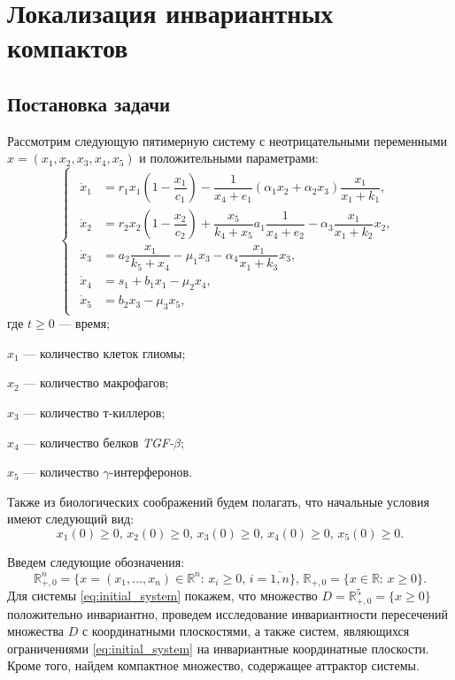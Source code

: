 \documentclass[14pt,a4paper]{extarticle}
\begin{document}
	\section{Локализация инвариантных компактов}
	\subsection{Постановка задачи}
	
	Рассмотрим следующую пятимерную систему с неотрицательными переменными $x=(x_1, x_2, x_3, x_4, x_5)$ и положительными параметрами:
	\begin{equation}
		\begin{cases}
			\begin{aligned}
				\dot{x}_1 &= r_1x_1\left(1-\dfrac{x_1}{c_1}\right)-\dfrac{1}{x_4+e_1}(\alpha_1x_2+\alpha_2x_3)\dfrac{x_1}{x_1+k_1},\\
				\dot{x}_2 &= r_2x_2\left(1-\dfrac{x_2}{c_2}\right)+\dfrac{x_5}{k_4+x_5}a_1\dfrac{1}{x_4+e_2}-\alpha_3\dfrac{x_1}{x_1+k_2}x_2,\\
				\dot{x}_3 &= a_2\dfrac{x_1}{k_5+x_4}-\mu_1x_3-\alpha_4\dfrac{x_1}{x_1+k_3}x_3,\\
				\dot{x}_4 &= s_1 + b_1x_1-\mu_2x_4,\\
				\dot{x}_5 &= b_2x_3-\mu_3x_5,
			\end{aligned}
		\end{cases}\label{eq:initial_system}
	\end{equation}
	где $t\ge0$ --- время;
	
	$x_1$ --- количество клеток глиомы; 
	
	$x_2$ --- количество макрофагов;
	
	$x_3$ --- количество т-киллеров;
	
	$x_4$ --- количество белков \textit{TGF-}$\beta$;
	
	$x_5$ --- количество $\gamma$-интерферонов. 
	
	Также из биологических соображений будем полагать, что начальные условия имеют следующий вид:
	\begin{equation}\label{eq:conds}
	x_1(0)\ge0,\,x_2(0)\ge0,\,x_3(0)\ge0,\,x_4(0)\ge0,\,x_5(0)\ge0.
	\end{equation}
	
	Введем следующие обозначения:
	\[\mathbb{R}^n_{+,0}=\{x=(x_1,\dots,x_n)\in\mathbb{R}^n:\, x_i\ge0,\, i=\overline{1,n}\},\,\mathbb{R}_{+,0}=\{x\in\mathbb{R}:\, x\ge0\}.\]
	Для системы \ref{eq:initial_system} покажем, что множество $D=\mathbb{R}^{5}_{+,0} = \{x \ge 0\}$ положительно инвариантно, проведем исследование инвариантности пересечений множества $D$ с координатными плоскостями, а также систем, являющихся ограничениями \ref{eq:initial_system} на инвариантные координатные плоскости. Кроме того, найдем компактное множество, содержащее аттрактор системы.
	
\end{document}
